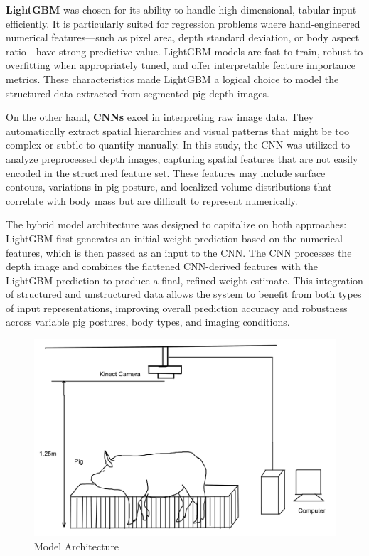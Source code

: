 {\textbf{LightGBM} was chosen for its ability to handle high-dimensional, tabular input efficiently. It is particularly suited for regression problems where hand-engineered numerical features—such as pixel area, depth standard deviation, or body aspect ratio—have strong predictive value. LightGBM models are fast to train, robust to overfitting when appropriately tuned, and offer interpretable feature importance metrics. These characteristics made LightGBM a logical choice to model the structured data extracted from segmented pig depth images.

On the other hand, \textbf{CNNs} excel in interpreting raw image data. They automatically extract spatial hierarchies and visual patterns that might be too complex or subtle to quantify manually. In this study, the CNN was utilized to analyze preprocessed depth images, capturing spatial features that are not easily encoded in the structured feature set. These features may include surface contours, variations in pig posture, and localized volume distributions that correlate with body mass but are difficult to represent numerically.

The hybrid model architecture was designed to capitalize on both approaches: LightGBM first generates an initial weight prediction based on the numerical features, which is then passed as an input to the CNN. The CNN processes the depth image and combines the flattened CNN-derived features with the LightGBM prediction to produce a final, refined weight estimate. This integration of structured and unstructured data allows the system to benefit from both types of input representations, improving overall prediction accuracy and robustness across variable pig postures, body types, and imaging conditions.

\newpage

\begin{figure}[h]
	\centering
	\includegraphics[height=0.4\textheight]{figures/Untitled-1wqw}
	\caption{Model Architecture}
	\label{fig:Model Architecture}
\end{figure}

}
